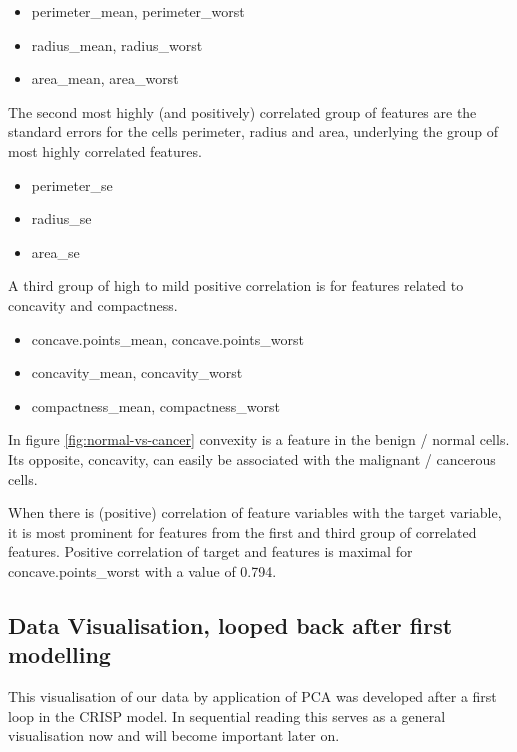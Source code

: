 \documentclass[]{article}
\providecommand{\tightlist}{%
  \setlength{\itemsep}{0pt}\setlength{\parskip}{0pt}}
\begin{document}
\begin{itemize}
\tightlist
\item
  perimeter\_mean, perimeter\_worst
\item
  radius\_mean, radius\_worst
\item
  area\_mean, area\_worst
\end{itemize}

The second most highly (and positively) correlated group of features are
the standard errors for the cells perimeter, radius and area, underlying
the group of most highly correlated features.

\begin{itemize}
\tightlist
\item
  perimeter\_se
\item
  radius\_se
\item
  area\_se
\end{itemize}

A third group of high to mild positive correlation is for features
related to concavity and compactness.

\begin{itemize}
\tightlist
\item
  concave.points\_mean, concave.points\_worst
\item
  concavity\_mean, concavity\_worst
\item
  compactness\_mean, compactness\_worst
\end{itemize}

In figure \ref{fig:normal-vs-cancer} convexity is a feature in the
benign / normal cells. Its opposite, concavity, can easily be associated
with the malignant / cancerous cells.

When there is (positive) correlation of feature variables with the
target variable, it is most prominent for features from the first and
third group of correlated features. Positive correlation of target and
features is maximal for concave.points\_worst with a value of 0.794.

\subsection{Data Visualisation, looped back after first
modelling}\label{data-visualisation-looped-back-after-first-modelling}

This visualisation of our data by application of PCA was developed after
a first loop in the CRISP model. In sequential reading this serves as a
general visualisation now and will become important later on.
\end{document}
